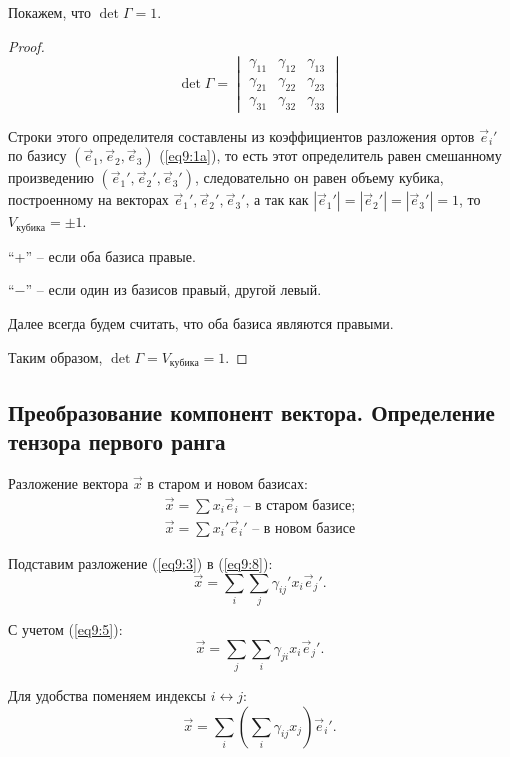 	Покажем, что \( \det \Gamma = 1 \).
	\begin{proof}
	
	\[ \det\Gamma = \begin{vmatrix}
			\gamma_{11} & \gamma_{12} & \gamma_{13} \\
			\gamma_{21} & \gamma_{22} & \gamma_{23} \\
			\gamma_{31} & \gamma_{32} & \gamma_{33}
	\end{vmatrix} \]
	
	Строки этого определителя составлены из коэффициентов разложения  ортов \( \vec{e}_i{'} \) по базису \( (\vec{e}_1, \vec{e}_2, \vec{e}_3) \) (\ref{eq9:1a}), то есть этот определитель равен смешанному произведению \( (\vec{e}_1{'}, \vec{e}_2{'}, \vec{e}_3{'}) \), следовательно он равен объему кубика, построенному на векторах \( \vec{e}_1{'}, \vec{e}_2{'}, \vec{e}_3{'} \), а так как \( |\vec{e}_1{'}| = |\vec{e}_2{'}| = |\vec{e}_3{'}| = 1 \), то \( V_{кубика} = \pm 1\).
	
	``+'' -- если оба базиса правые.
	
	``\( - \)'' -- если один из базисов правый, другой левый.
	
	Далее всегда будем считать, что оба базиса являются правыми.
	
	Таким образом, \( \det\Gamma  = V_{кубика} = 1 \).
	\end{proof}
	
\subsection{Преобразование компонент вектора. Определение тензора первого ранга}

	Разложение вектора \( \vec{x} \) в старом и новом базисах:
	\begin{align}
		\vec{x} = \sum x_i \vec{e}_i  \label{eq9:8} \text{ -- в старом базисе;} \\
		\vec{x} = \sum x_i' \vec{e}_i{'}  \label{eq9:9} \text{ -- в новом базисе}  
	\end{align}
	
	Подставим разложение (\ref{eq9:3}) в (\ref{eq9:8}):
	\[ \vec{x} = \sum\limits_i\sum\limits_j \gamma_{ij}' x_i \vec{e}_j{'}. \]
	
	С учетом (\ref{eq9:5}):
	\[ \vec{x} = \sum\limits_j\sum\limits_i \gamma_{ji} x_i \vec{e}_j{'}. \]
	
	Для удобства поменяем индексы \( i \leftrightarrow j \):
	\[ \vec{x} = \sum\limits_i \left(\sum\limits_i \gamma_{ij} x_j\right) \vec{e}_i{'}. \]
	
